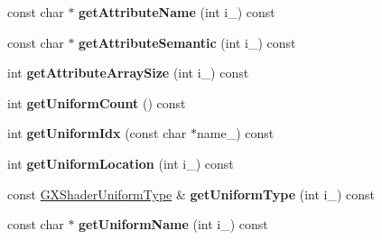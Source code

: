 \begin{DoxyCompactItemize}
\item 
const char $\ast$ {\bfseries get\+Attribute\+Name} (int i\+\_\+) const \hypertarget{class_magnum_1_1_g_x_shader_program_ac7736f1b763e137093a34e927ab459e4}{}\label{class_magnum_1_1_g_x_shader_program_ac7736f1b763e137093a34e927ab459e4}

\item 
const char $\ast$ {\bfseries get\+Attribute\+Semantic} (int i\+\_\+) const \hypertarget{class_magnum_1_1_g_x_shader_program_a69f1d823710011652793671fc834ac6a}{}\label{class_magnum_1_1_g_x_shader_program_a69f1d823710011652793671fc834ac6a}

\item 
int {\bfseries get\+Attribute\+Array\+Size} (int i\+\_\+) const \hypertarget{class_magnum_1_1_g_x_shader_program_afb1d474ba89c64773dc9f2428ae5901c}{}\label{class_magnum_1_1_g_x_shader_program_afb1d474ba89c64773dc9f2428ae5901c}

\item 
int {\bfseries get\+Uniform\+Count} () const \hypertarget{class_magnum_1_1_g_x_shader_program_a7c4c8cfc18671c0d1a37a7b77909aa01}{}\label{class_magnum_1_1_g_x_shader_program_a7c4c8cfc18671c0d1a37a7b77909aa01}

\item 
int {\bfseries get\+Uniform\+Idx} (const char $\ast$name\+\_\+) const \hypertarget{class_magnum_1_1_g_x_shader_program_a43a4db63f482c23fea3325b561ab871b}{}\label{class_magnum_1_1_g_x_shader_program_a43a4db63f482c23fea3325b561ab871b}

\item 
int {\bfseries get\+Uniform\+Location} (int i\+\_\+) const \hypertarget{class_magnum_1_1_g_x_shader_program_a1ff7ad0c9212570616455d7f5a5ca280}{}\label{class_magnum_1_1_g_x_shader_program_a1ff7ad0c9212570616455d7f5a5ca280}

\item 
const \hyperlink{class_magnum_1_1_g_x_shader_uniform_type}{G\+X\+Shader\+Uniform\+Type} \& {\bfseries get\+Uniform\+Type} (int i\+\_\+) const \hypertarget{class_magnum_1_1_g_x_shader_program_add392032da9ad36aab05bd3c3f8137ed}{}\label{class_magnum_1_1_g_x_shader_program_add392032da9ad36aab05bd3c3f8137ed}

\item 
const char $\ast$ {\bfseries get\+Uniform\+Name} (int i\+\_\+) const \hypertarget{class_magnum_1_1_g_x_shader_program_a5367332348b0c753d390a3f0c8940f14}{}\label{class_magnum_1_1_g_x_shader_program_a5367332348b0c753d390a3f0c8940f14}


\end{DoxyCompactItemize}
